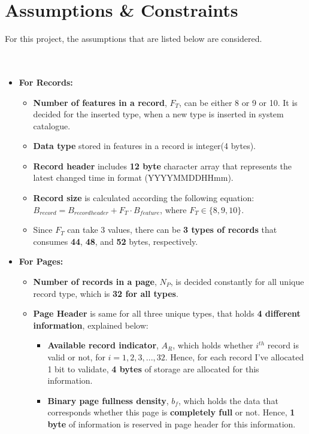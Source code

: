 \documentclass[12pt]{report}
\begin{document}
\chapter{Assumptions \& Constraints}
For this project, the assumptions that are listed below are considered. \\\\\\
\begin{itemize}
\item {\large \textbf{For Records:}}
\begin{itemize}
\item \textbf{Number of features in a record}, $F_{T}$, can be either 8 or 9 or 10. It is decided for the inserted type, when a new type is inserted in system catalogue.
\item \textbf{Data type} stored in features in a record is integer(4 bytes).
\item \textbf{Record header} includes \textbf{12 byte} character array that represents the latest changed time in format (YYYYMMDDHHmm).
\item \textbf{Record size} is calculated according the following equation: \\ 
{\large $B_{record} = B_{recordheader} + {F_T}\cdot{B_{feature}}$, where ${F_T}\in{\{8,9,10\}}$}.
\item Since $F_{T}$ can take 3 values, there can be \textbf{3 types of records} that consumes \textbf{44}, \textbf{48}, and \textbf{52} bytes, respectively.
\end{itemize}
\newpage
\item {\large \textbf{For Pages:}}
\begin{itemize}
\item \textbf{Number of records in a page}, $N_P$, is decided constantly for all unique record type, which is \textbf{32 for all types}.
\item \textbf{Page Header} is same for all three unique types, that holds \textbf{4 different information}, explained below:
\begin{itemize}
\item \textbf{Available record indicator}, $A_R$, which holds whether $i^{th}$ record is valid or not, for ${i} = 1, 2, 3, ..., 32$. Hence, for each record I've allocated 1 bit to validate, \textbf{4 bytes} of storage are allocated for this information.
\item \textbf{Binary page fullness density}, $b_f$, which holds the data that corresponds whether this page is \textbf{completely full} or not. Hence, \textbf{1 byte} of information is reserved in page header for this information.

\end{itemize}
\end{itemize}
\end{itemize}
\end{document}
